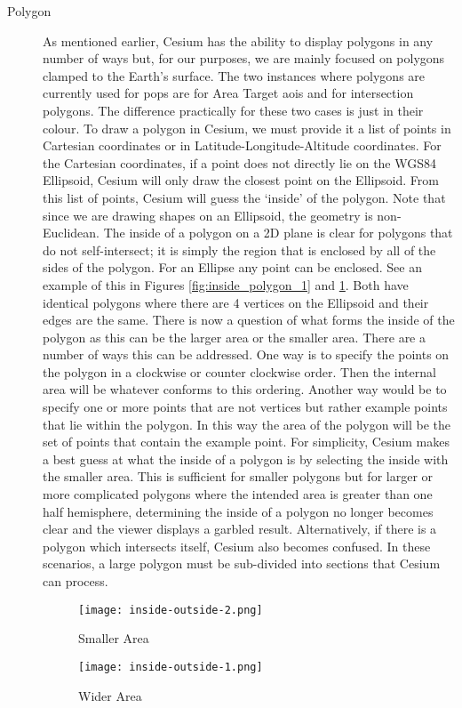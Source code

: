 \begin{description}
    \item[Polygon] As mentioned earlier, Cesium has the ability to display
	polygons in any number of ways but, for our purposes, we are mainly
	focused on polygons clamped to the Earth's surface. The two instances
	where polygons are currently used for \gls{pops} are for Area Target
	\glspl{aoi} and for intersection polygons. The difference practically
	for these two cases is just in their colour. To draw a polygon in
	Cesium, we must provide it a list of points in Cartesian coordinates or
	in Latitude-Longitude-Altitude coordinates. For the Cartesian
	coordinates, if a point does not directly lie on the WGS84 Ellipsoid,
	Cesium will only draw the closest point on the Ellipsoid. From this
	list of points, Cesium will guess the `inside' of the polygon. Note
	that since we are drawing shapes on an Ellipsoid, the geometry is
	non-Euclidean. The inside of a polygon on a 2D plane is clear for
	polygons that do not self-intersect; it is simply the region that
	is enclosed by all of the sides of the polygon. For an Ellipse any
	point can be enclosed. See an example of this in Figures
	\ref{fig:inside_polygon_1} and \ref{fig:inside_polygon_2}. Both have
	identical polygons where there are 4 vertices on the Ellipsoid and
	their edges are the same. There is now a question of what forms the
	inside of the polygon as this can be the larger area or the smaller
	area. There are a number of ways this can be addressed. One way is to
	specify the points on the polygon in a clockwise or counter clockwise
	order. Then the internal area will be whatever conforms to this
	ordering. Another way would be to specify one or more points that are
	not vertices but rather example points that lie within the polygon. In
	this way the area of the polygon will be the set of points that contain
	the example point. For simplicity, Cesium makes a best guess at what
	the inside of a polygon is by selecting the inside with the smaller
	area. This is sufficient for smaller polygons but for larger or more
	complicated polygons where the intended area is greater than one half
	hemisphere, determining the inside of a polygon no longer becomes clear
	and the viewer displays a garbled result. Alternatively, if there is a
	polygon which intersects itself, Cesium also becomes confused. In these
	scenarios, a large polygon must be sub-divided into sections that
	Cesium can process.

\begin{figure}
    \begin{minipage}[c]{0.45\textwidth}
	\centering
	\texttt{[image: inside-outside-2.png]} 
	\caption{Smaller Area}
	\label{fig:inside_polygon_1}
    \end{minipage}
    \hfill
    \begin{minipage}[c]{0.45\textwidth}
	\centering
	\texttt{[image: inside-outside-1.png]} 
	\caption{Wider Area}
	\label{fig:inside_polygon_2}
    \end{minipage} 
\end{figure}




\end{description}
